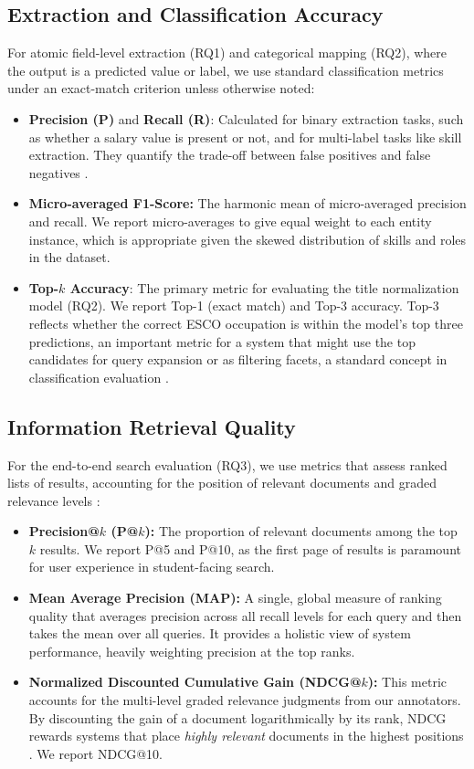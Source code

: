 \subsection{Extraction and Classification Accuracy}
For atomic field-level extraction (RQ1) and categorical mapping (RQ2), where the output is a predicted value or label, we use standard classification metrics under an exact-match criterion unless otherwise noted:
\begin{itemize}
    \item \textbf{Precision (P)} and \textbf{Recall (R)}: Calculated for binary extraction tasks, such as whether a salary value is present or not, and for multi-label tasks like skill extraction. They quantify the trade-off between false positives and false negatives \cite{manning2008introduction}.
    \item \textbf{Micro-averaged F1-Score:} The harmonic mean of micro-averaged precision and recall. We report micro-averages to give equal weight to each entity instance, which is appropriate given the skewed distribution of skills and roles in the dataset.
    \item \textbf{Top-\(k\) Accuracy}: The primary metric for evaluating the title normalization model (RQ2). We report Top-1 (exact match) and Top-3 accuracy. Top-3 reflects whether the correct ESCO occupation is within the model's top three predictions, an important metric for a system that might use the top candidates for query expansion or as filtering facets, a standard concept in classification evaluation \cite{menghani2023efficient}.
\end{itemize}

\subsection{Information Retrieval Quality}
For the end-to-end search evaluation (RQ3), we use metrics that assess ranked lists of results, accounting for the position of relevant documents and graded relevance levels \cite{baeza2011modern, buttcher2016information}:
\begin{itemize}
    \item \textbf{Precision@\(k\) (P@\(k\)):} The proportion of relevant documents among the top \(k\) results. We report P@5 and P@10, as the first page of results is paramount for user experience in student-facing search.
    \item \textbf{Mean Average Precision (MAP):} A single, global measure of ranking quality that averages precision across all recall levels for each query and then takes the mean over all queries. It provides a holistic view of system performance, heavily weighting precision at the top ranks.
    \item \textbf{Normalized Discounted Cumulative Gain (NDCG@\(k\)):} This metric accounts for the multi-level graded relevance judgments from our annotators. By discounting the gain of a document logarithmically by its rank, NDCG rewards systems that place \emph{highly relevant} documents in the highest positions \cite{jarvelin2002cumulated}. We report NDCG@10.
\end{itemize}


